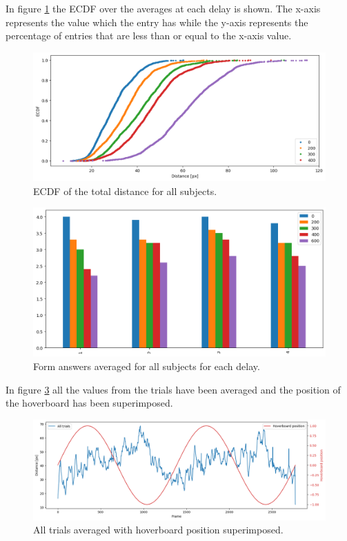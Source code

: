 \documentclass[nofilelist]{cslthse-msc}
\begin{document}
In figure \ref{fig:ecdf} the ECDF over the averages at each delay is shown. The x-axis represents the value which the entry has while the y-axis represents the percentage of entries that are less than or equal to the x-axis value.

\begin{figure}[!hbt]
   \centering
   \includegraphics[scale=0.5]{images/ecdf.png} 
   \caption{ECDF of the total distance for all subjects.}
   \label{fig:ecdf}
\end{figure}

\begin{figure}[!hbt]
   \centering
   \includegraphics[scale=0.5]{images/form-ans.png} 
   \caption{Form answers averaged for all subjects for each delay.}
   \label{fig:form-ans}
\end{figure}

In figure \ref{fig:hoverboard-pos} all the values from the trials have been averaged and the position of the hoverboard has been superimposed.

\begin{figure}[!hbt]
   \centering
   \includegraphics[scale=0.4]{images/hoverboard-pos.png} 
   \caption{All trials averaged with hoverboard position superimposed.}
   \label{fig:hoverboard-pos}
\end{figure}
\end{document}

